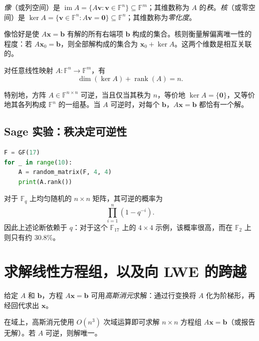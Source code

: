 \begin{definition}[像、核、秩]
\emph{像}（或列空间）是 $\operatorname{im}A = \{A\mathbf{v} : \mathbf{v}\in\mathbb{F}^n\}\subseteq\mathbb{F}^m$；其维数称为 $A$ 的\emph{秩}。\emph{核}（或零空间）是 $\ker A = \{\mathbf{v}\in\mathbb{F}^n : A\mathbf{v}=\mathbf{0}\}\subseteq\mathbb{F}^n$；其维数称为\emph{零化度}。
\end{definition}

像恰好是使 $A\mathbf{x}=\mathbf{b}$ 有解的所有右端项 $\mathbf{b}$ 构成的集合。核则衡量解偏离唯一性的程度：若 $A\mathbf{x}_0=\mathbf{b}$，则全部解构成的集合为 $\mathbf{x}_0 + \ker A$。这两个维数是相互关联的。

\begin{theorem}[秩--零化度定理]
对任意线性映射 $A\colon \mathbb{F}^n \to \mathbb{F}^m$，有
\[
\dim(\ker A) + \operatorname{rank}(A) = n.
\]
\end{theorem}

特别地，方阵 $A\in\mathbb{F}^{n\times n}$ 可逆，当且仅当其秩为 $n$，等价地 $\ker A=\{\mathbf{0}\}$，又等价地其各列构成 $\mathbb{F}^n$ 的一组基。当 $A$ 可逆时，对每个 $\mathbf{b}$，$A\mathbf{x}=\mathbf{b}$ 都恰有一个解。

\subsection{Sage 实验：秩决定可逆性}

\begin{lstlisting}[language=Python]
F = GF(17)
for _ in range(10):
    A = random_matrix(F, 4, 4)
    print(A.rank())
\end{lstlisting}

对于 $\mathbb{F}_q$ 上均匀随机的 $n\times n$ 矩阵，其可逆的概率为
\[
\prod_{i=1}^{n}(1-q^{-i}).
\]
因此上述论断依赖于 $q$：对于这个 $\mathbb{F}_{17}$ 上的 $4\times4$ 示例，该概率很高，而在 $\mathbb{F}_2$ 上则只有约 $30.8\%$。

\section{求解线性方程组，以及向 LWE 的跨越}
给定 $A$ 和 $\mathbf{b}$，方程 $A\mathbf{x}=\mathbf{b}$ 可用\emph{高斯消元}求解：通过行变换将 $A$ 化为阶梯形，再经回代求出 $\mathbf{x}$。

\begin{proposition}[线性方程组是容易的]
在域上，高斯消元使用 $O(n^3)$ 次域运算即可求解 $n\times n$ 方程组 $A\mathbf{x}=\mathbf{b}$（或报告无解）。若 $A$ 可逆，则解唯一。
\end{proposition}

